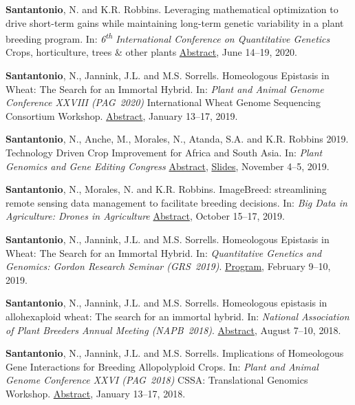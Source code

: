 \documentclass[10pt]{article}
\begin{document}
\begin{bibenum}

\item \textbf{Santantonio}, N. and K.R. Robbins. Leveraging mathematical optimization to drive short-term gains while maintaining long-term genetic variability in a plant breeding program. In: \emph{6\textsuperscript{th} International Conference on Quantitative Genetics} Crops, horticulture, trees \& other plants \href{https://icqg6.org/} {Abstract}, June 14--19, 2020.

\item \textbf{Santantonio}, N., Jannink, J.L. and M.S. Sorrells. Homeologous Epistasis in Wheat: The Search for an Immortal Hybrid. In:  \emph{Plant and Animal Genome Conference  XXVIII (PAG~2020)} International Wheat Genome Sequencing Consortium Workshop. \href{https://www.wheatgenome.org/Meetings-and-Workshops/PAG-2020/Speaker-Profiles/Nicholas-Santantonio} {Abstract}, January 13--17, 2019.

\item \textbf{Santantonio}, N., Anche, M., Morales, N., Atanda, S.A. and K.R. Robbins 2019. Technology Driven Crop Improvement for Africa and South Asia. In: \emph{Plant Genomics and Gene Editing Congress} \href{http://www.global-engage.com/event/plant-genomics-usa/#speakers-slideshow} {Abstract}, \href{http://www.globalengage.co.uk/pgc/docs/Santantonio.pdf} {Slides}, November 4--5, 2019.

\item \textbf{Santantonio}, N., Morales, N. and K.R. Robbins. ImageBreed: streamlining remote sensing data management to facilitate breeding decisions. In: \emph{Big Data in Agriculture: Drones in Agriculture} \href{} {Abstract}, October 15--17, 2019.

\item \textbf{Santantonio}, N., Jannink, J.L. and M.S. Sorrells. Homeologous Epistasis in Wheat: The Search for an Immortal Hybrid. In: \emph{Quantitative Genetics and Genomics: Gordon Research Seminar (GRS~2019)}. \href{https://www.grc.org/quantitative-genetics-and-genomics-grs-conference/2019/}{Program}, February 9--10, 2019.

\item \textbf{Santantonio}, N., Jannink, J.L. and M.S. Sorrells. Homeologous epistasis in allohexaploid wheat: The search for an immortal hybrid. In: \emph{National Association of Plant Breeders Annual Meeting (NAPB~2018)}. \href{https://www.plant.uoguelph.ca/napb/abstracts-posters}{Abstract}, August 7--10, 2018.

\item \textbf{Santantonio}, N., Jannink, J.L. and M.S. Sorrells.  Implications of Homeologous Gene Interactions for Breeding Allopolyploid Crops. In: \emph{Plant and Animal Genome Conference  XXVI (PAG~2018)} CSSA: Translational Genomics Workshop. \href{https://pag.confex.com/pag/xxvi/meetingapp.cgi/Paper/28461} {Abstract}, January 13--17, 2018.

\end{bibenum}
\end{document}
